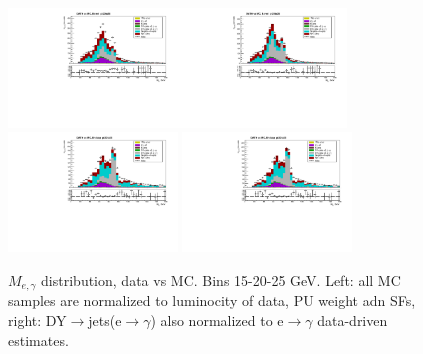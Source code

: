\begin{figure}[htb]
\begin{center}
    \includegraphics[width=0.40\textwidth]{../figs/figs_v11/ELECTRON_WGamma/PrepareYields/c_TotalDATAvsMC_Barrel__Mpholep1PRELIMINARY_FOR_E_TO_GAMMA_WITH_PSV_CUT_pt20to25_.pdf}\includegraphics[width=0.40\textwidth]{../figs/figs_v11/ELECTRON_WGamma/PrepareYields/c_TotalDATAvsMC_Barrel__Mpholep1PRELIMINARY_FOR_E_TO_GAMMA_WITH_PSV_CUT_pt20to25__etogScale.pdf}\\
    \includegraphics[width=0.40\textwidth]{../figs/figs_v11/ELECTRON_WGamma/PrepareYields/c_TotalDATAvsMC_Endcap__Mpholep1PRELIMINARY_FOR_E_TO_GAMMA_WITH_PSV_CUT_pt20to25_.pdf} \includegraphics[width=0.40\textwidth]{../figs/figs_v11/ELECTRON_WGamma/PrepareYields/c_TotalDATAvsMC_Endcap__Mpholep1PRELIMINARY_FOR_E_TO_GAMMA_WITH_PSV_CUT_pt20to25__etogScale.pdf}\\
   \label{fig:Mpholep1DatavsMC_15to25}
  \caption{$M_{e,\gamma}$ distribution, data vs MC. Bins 15-20-25 GeV. Left: all MC samples are normalized to luminocity of data, PU weight adn SFs, right: DY$\rightarrow$jets(e$\rightarrow\gamma$) also normalized to e$\rightarrow\gamma$ data-driven estimates.}
  \end{center}
\end{figure}
